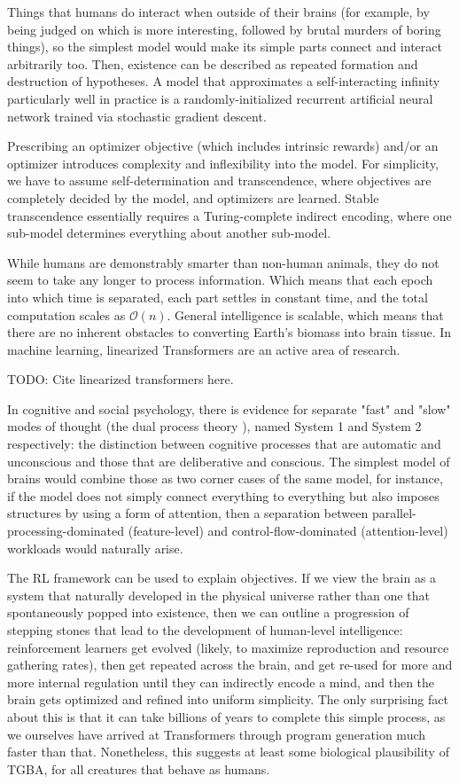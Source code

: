 \documentclass{article}
\begin{document}
Things that humans do interact when outside of their brains (for example, by being judged on which is more interesting, followed by brutal murders of boring things), so the simplest model would make its simple parts connect and interact arbitrarily too. Then, existence can be described as repeated formation and destruction of hypotheses. A model that approximates a self-interacting infinity particularly well in practice is a randomly-initialized recurrent artificial neural network trained via stochastic gradient descent.

Prescribing an optimizer objective (which includes intrinsic rewards) and/or an optimizer introduces complexity and inflexibility into the model. For simplicity, we have to assume self-determination and transcendence, where objectives are completely decided by the model, and optimizers are learned. Stable transcendence essentially requires a Turing-complete indirect encoding, where one sub-model determines everything about another sub-model.

While humans are demonstrably smarter than non-human animals, they do not seem to take any longer to process information. Which means that each epoch into which time is separated, each part settles in constant time, and the total computation scales as $\mathcal{O}(n)$. General intelligence is scalable, which means that there are no inherent obstacles to converting Earth's biomass into brain tissue. In machine learning, linearized Transformers are an active area of research.

    TODO: Cite linearized transformers here.

In cognitive and social psychology, there is evidence for separate "fast" and "slow" modes of thought (the dual process theory \cite{doi:10.1146/annurev.psych.59.103006.093629}), named System 1 and System 2 respectively: the distinction between cognitive processes that are automatic and unconscious and those that are deliberative and conscious. The simplest model of brains would combine those as two corner cases of the same model, for instance, if the model does not simply connect everything to everything but also imposes structures by using a form of attention, then a separation between parallel-processing-dominated (feature-level) and control-flow-dominated (attention-level) workloads would naturally arise.

The RL framework can be used to explain objectives. If we view the brain as a system that naturally developed in the physical universe rather than one that spontaneously popped into existence, then we can outline a progression of stepping stones that lead to the development of human-level intelligence: reinforcement learners get evolved (likely, to maximize reproduction and resource gathering rates), then get repeated across the brain, and get re-used for more and more internal regulation until they can indirectly encode a mind, and then the brain gets optimized and refined into uniform simplicity. The only surprising fact about this is that it can take billions of years to complete this simple process, as we ourselves have arrived at Transformers through program generation much faster than that. Nonetheless, this suggests at least some biological plausibility of TGBA, for all creatures that behave as humans.
\end{document}
